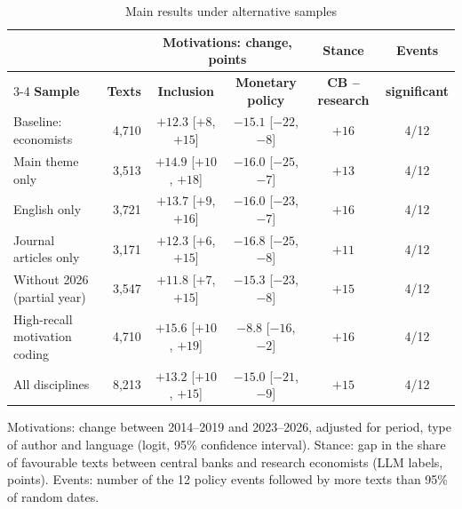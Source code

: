 \begin{table}[htbp]
\centering\footnotesize
\caption{Main results under alternative samples}\label{tab:robustness}
\setlength{\tabcolsep}{4pt}
\begin{tabular}{@{}lrcccc@{}}
\toprule
 & & \multicolumn{2}{c}{\textbf{Motivations: change, points}} & \textbf{Stance} & \textbf{Events} \\
\cmidrule(lr){3-4}
\textbf{Sample} & \textbf{Texts} & \textbf{Inclusion} & \textbf{Monetary policy} & \textbf{CB -- research} & \textbf{significant} \\
\midrule
Baseline: economists          & 4,710 & $+12.3$ {\scriptsize[$+8$, $+15$]}  & $-15.1$ {\scriptsize[$-22$, $-8$]} & $+16$ & 4/12 \\
Main theme only               & 3,513 & $+14.9$ {\scriptsize[$+10$, $+18$]} & $-16.0$ {\scriptsize[$-25$, $-7$]} & $+13$ & 4/12 \\
English only                  & 3,721 & $+13.7$ {\scriptsize[$+9$, $+16$]}  & $-16.0$ {\scriptsize[$-23$, $-7$]} & $+16$ & 4/12 \\
Journal articles only         & 3,171 & $+12.3$ {\scriptsize[$+6$, $+15$]}  & $-16.8$ {\scriptsize[$-25$, $-8$]} & $+11$ & 4/12 \\
Without 2026 (partial year)   & 3,547 & $+11.8$ {\scriptsize[$+7$, $+15$]}  & $-15.3$ {\scriptsize[$-23$, $-8$]} & $+15$ & 4/12 \\
High-recall motivation coding & 4,710 & $+15.6$ {\scriptsize[$+10$, $+19$]} & $-8.8$ {\scriptsize[$-16$, $-2$]}  & $+16$ & 4/12 \\
All disciplines               & 8,213 & $+13.2$ {\scriptsize[$+10$, $+15$]} & $-15.0$ {\scriptsize[$-21$, $-9$]} & $+15$ & 4/12 \\
\bottomrule
\end{tabular}
\par\smallskip\parbox{0.92\linewidth}{\footnotesize Motivations: change between 2014--2019 and 2023--2026, adjusted for period, type of author and language (logit, 95\% confidence interval). Stance: gap in the share of favourable texts between central banks and research economists (LLM labels, points). Events: number of the 12 policy events followed by more texts than 95\% of random dates.}
\end{table}
